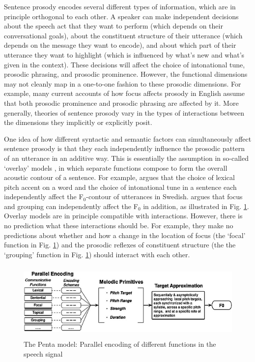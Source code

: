 \documentclass[preprint,review,12pt,authoryear,times]{elsarticle}
\begin{document}
Sentence prosody encodes several different types of information, which are in principle orthogonal to each other. A speaker can make independent decisions about the speech act that they want to perform (which depends on their conversational goals), about the constituent structure of their utterance (which depends on the message they want to encode), and about which part of their utterance they want to highlight (which is influenced by what's new and what's given in the context). These decisions will affect the choice of intonational tune, prosodic phrasing, and prosodic prominence. However, the functional dimensions may not cleanly map in a one-to-one fashion to these prosodic dimensions. For example, many current accounts of how focus affects prosody in English assume that both prosodic prominence and prosodic phrasing are affected by it. More generally, theories of sentence prosody vary in the types of interactions between the dimensions they implicitly or explicitly posit. 
 
One idea of how different syntactic and semantic factors can simultaneously affect sentence prosody is that they each independently influence the prosodic pattern of an utterance in an additive way. This is essentially the assumption in so-called `overlay' models \citep{ohman67,fujis81,mobiu93,baill05,xu05,geraz18}, in which separate functions compose to form the overall acoustic contour of a sentence. For example, \citet{ohman67} argues that the choice of lexical pitch accent on a word and the choice of intonational tune in a sentence each independently affect the F$_0$-contour of utterances in Swedish. \citet{xu05} argues that focus and grouping can independently affect the F$_0$  in addition, as illustrated in Fig. \ref{figPenta}. Overlay models are in principle compatible with interactions. However, there is no prediction what these interactions should be. For example, they make no predictions about whether and how a change in the location of focus (the `focal' function in Fig. \ref{figPenta}) and the prosodic reflexes of constituent structure (the the `grouping' function in Fig. \ref{figPenta}) should interact with each other.


\begin{figure}[!ht]
	\begin{center}
		\includegraphics[height=1.5in]{Figures/penta.png}
		\caption{The Penta model: Parallel encoding of different functions in the speech signal \citep[from][]{xu05}}
	\end{center}
	\label{figPenta}
\end{figure}
\end{document}
